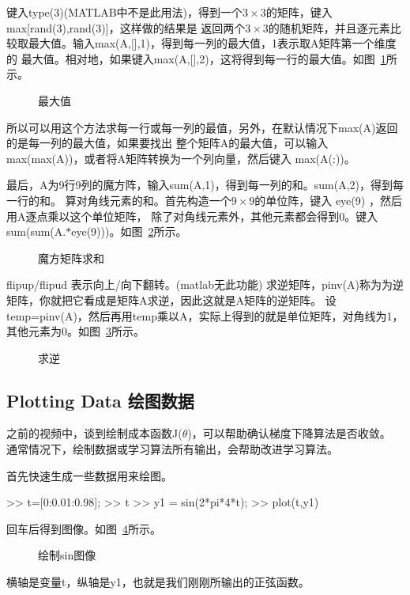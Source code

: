\documentclass[UTF8]{ctexart}
\begin{document}
键入type(3)(MATLAB中不是此用法)，得到一个$3\times3$的矩阵，键入max[rand(3),rand(3)]，这样做的结果是
返回两个$3\times3$的随机矩阵，并且逐元素比较取最大值。输入max(A,[],1)，得到每一列的最大值，1表示取A矩阵第一个维度的
最大值。相对地，如果键入max(A,[],2)，这将得到每一行的最大值。如图~\ref{fig:24}所示。
\begin{figure}[H]
 \caption{最大值}
 \label{fig:24}
\end{figure}

所以可以用这个方法求每一行或每一列的最值，另外，在默认情况下max(A)返回的是每一列的最大值，如果要找出
整个矩阵A的最大值，可以输入max(max(A))，或者将A矩阵转换为一个列向量，然后键入 max(A(:))。

 最后，A为9行9列的魔方阵，输入sum(A,1)，得到每一列的和。sum(A,2)，得到每一行的和。
 算对角线元素的和。首先构造一个$9\times9$的单位阵，键入 eye(9) ，然后用A逐点乘以这个单位矩阵，
 除了对角线元素外，其他元素都会得到0。键入sum(sum(A.$*$eye(9)))。如图~\ref{fig:25}所示。
 \begin{figure}[H]
  \caption{魔方矩阵求和}
  \label{fig:25}
 \end{figure}

flipup/flipud 表示向上/向下翻转。(matlab无此功能)
求逆矩阵，pinv(A)称为为逆矩阵，你就把它看成是矩阵A求逆，因此这就是A矩阵的逆矩阵。
设temp=pinv(A)，然后再用temp乘以A，实际上得到的就是单位矩阵，对角线为1，其他元素为0。如图~\ref{fig:26}所示。
\begin{figure}[H]
 \caption{求逆}
 \label{fig:26}
\end{figure}

\subsection{Plotting Data 绘图数据}
之前的视频中，谈到绘制成本函数J($\theta$)，可以帮助确认梯度下降算法是否收敛。
通常情况下，绘制数据或学习算法所有输出，会帮助改进学习算法。

首先快速生成一些数据用来绘图。

>> t=[0:0.01:0.98];
>> t
>> y1 = sin(2*pi*4*t);
>> plot(t,y1)

回车后得到图像。如图~\ref{fig:27}所示。
\begin{figure}[H]
 \caption{绘制sin图像}
 \label{fig:27}
\end{figure}
横轴是变量t，纵轴是y1，也就是我们刚刚所输出的正弦函数。
\end{document}
